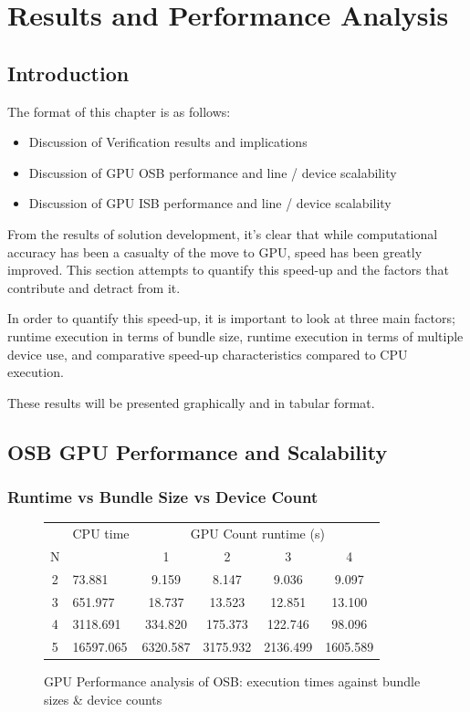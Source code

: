 \chapter{Results and Performance Analysis}
\section{Introduction}
The format of this chapter is as follows:
\begin{itemize}
  \item Discussion of Verification results and implications
  \item Discussion of GPU OSB performance and line / device scalability
  \item Discussion of GPU ISB performance and line / device scalability
\end{itemize}

From the results of solution development, it's clear that while computational accuracy has been a casualty of the move to GPU, speed has been greatly improved. This section attempts to quantify this speed-up and the factors that contribute and detract from it.

In order to quantify this speed-up, it is important to look at three main factors; runtime execution in terms of bundle size, runtime execution in terms of multiple device use, and comparative speed-up characteristics compared to CPU execution.

These results will be presented graphically and in tabular format.

\section{OSB GPU Performance and Scalability}
\subsection{Runtime vs Bundle Size vs Device Count}
\begin{figure}[h!]
\centering
  \begin{tabularx}{0.6\textwidth}{|c|X|c|c|c|c|}
  \hline
  &CPU time&\multicolumn{4}{|c|}{GPU Count runtime (s)}\\
  N&&1&2&3&4\\\hline
  2&73.881&9.159&8.147&9.036&9.097\\
  3&651.977&18.737&13.523&12.851&13.100\\
  4&3118.691&334.820&175.373&122.746&98.096\\
  5&16597.065&6320.587&3175.932&2136.499&1605.589\\\hline
  \end{tabularx}
\caption{GPU Performance analysis of OSB: execution times against bundle sizes \& device counts}
\label{tab:OSBTable}
\end{figure}

